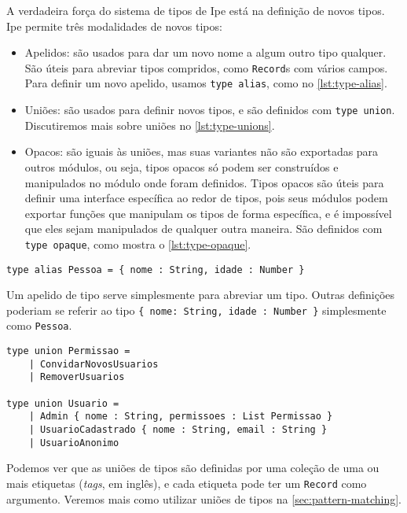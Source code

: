 A verdadeira força do sistema de tipos de Ipe está na definição de novos tipos.
Ipe permite três modalidades de novos tipos:

\begin{itemize}
    \item Apelidos: são usados para dar um novo nome a algum outro tipo qualquer.
          São úteis para abreviar tipos compridos, como \texttt{Record}s com vários
          campos. Para definir um novo apelido, usamos \texttt{type alias}, como
          no \autoref{lst:type-alias}.
    \item Uniões: são usados para definir novos tipos, e são definidos com \texttt{type union}.
          Discutiremos mais sobre uniões no \autoref{lst:type-unions}.
    \item Opacos: são iguais às uniões, mas suas variantes não são exportadas para
          outros módulos, ou seja, tipos opacos só podem ser construídos e manipulados
          no módulo onde foram definidos. Tipos opacos são úteis para definir uma interface
          específica ao redor de tipos, pois seus módulos podem exportar funções
          que manipulam os tipos de forma específica, e é impossível que eles sejam manipulados
          de qualquer outra maneira. São definidos com \texttt{type opaque}, como
          mostra o \autoref{lst:type-opaque}.
\end{itemize}


\begin{lstlisting}[label={lst:type-alias},caption={Exemplo de apelido de tipo}]
type alias Pessoa = { nome : String, idade : Number }
\end{lstlisting}

Um apelido de tipo serve simplesmente para abreviar um tipo. Outras definições
poderiam se referir ao tipo \texttt{\{ nome: String, idade : Number \}} simplesmente
como \texttt{Pessoa}.

\begin{lstlisting}[label={lst:type-unions},caption={Exemplo de união de tipos}]
type union Permissao =
    | ConvidarNovosUsuarios
    | RemoverUsuarios

type union Usuario =
    | Admin { nome : String, permissoes : List Permissao }
    | UsuarioCadastrado { nome : String, email : String }
    | UsuarioAnonimo
\end{lstlisting}

Podemos ver que as uniões de tipos são definidas por uma coleção de uma ou mais
etiquetas (\textit{tags}, em inglês), e cada etiqueta pode ter um \texttt{Record}
como argumento. Veremos mais como utilizar uniões de tipos na \autoref{sec:pattern-matching}.

